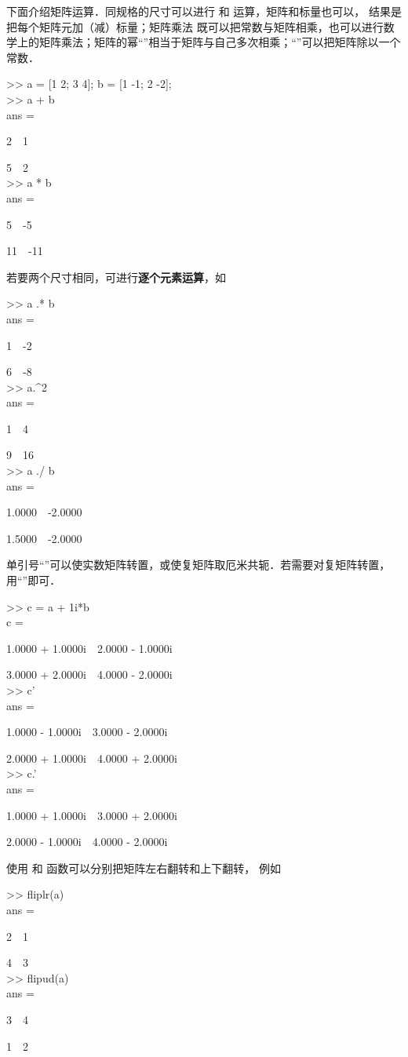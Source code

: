 下面介绍矩阵运算．同规格的尺寸可以进行 \x{+} 和 \x{-} 运算，矩阵和标量也可以， 结果是把每个矩阵元加（减）标量；矩阵乘法\x{*} 既可以把常数与矩阵相乘，也可以进行数学上的矩阵乘法；矩阵的幂“\x{\^{}}”相当于矩阵与自己多次相乘；“\x{/}”可以把矩阵除以一个常数．
\begin{Command}
>> a = [1 2; 3 4]; b = [1 -1; 2 -2]; \\
>> a + b \\
ans = \par
2\ \ 1 \par
5\ \ 2\\
>> a * b \\
ans = \par
5\ \ -5 \par
11\ \ -11
\end{Command}
若要两个尺寸相同，可进行\textbf{逐个元素运算}，如
\begin{Command}
>> a .* b \\
ans = \par
1\ \ -2 \par
6\ \ -8\\
>> a.\^{}2 \\
ans = \par
1\ \ 4 \par
9\ \ 16 \\
>> a ./ b \\
ans = \par
1.0000\ \ -2.0000 \par
1.5000\ \ -2.0000
\end{Command}
单引号“”可以使实数矩阵转置，或使复矩阵取厄米共轭．若需要对复矩阵转置，用“”即可．
\begin{Command}
>> c = a + 1i*b \\
c = \par
1.0000 + 1.0000i\ \ 2.0000 - 1.0000i \par
3.0000 + 2.0000i\ \ 4.0000 - 2.0000i \\
>> c' \\
ans = \par
1.0000 - 1.0000i\ \ 3.0000 - 2.0000i \par
2.0000 + 1.0000i\ \ 4.0000 + 2.0000i \\
>> c.' \\
ans = \par
1.0000 + 1.0000i\ \ 3.0000 + 2.0000i \par
2.0000 - 1.0000i\ \ 4.0000 - 2.0000i
\end{Command}
使用  和  函数可以分别把矩阵左右翻转和上下翻转， 例如
\begin{Command}
>> fliplr(a)\\
ans = \par
2\ \ 1\par
4\ \ 3\\
>> flipud(a)\\
ans = \par
3\ \ 4\par
1\ \ 2
\end{Command}

